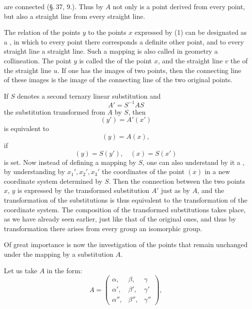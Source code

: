 are connected (\S.\,37, 9.). Thus by $A$ not only is a point derived from every point, but also a straight line from every straight line.

The relation of the points $y$ to the points $x$ expressed by (1) can be designated as a , in which to every point there corresponds a definite other point, and to every straight line a straight line. Such a mapping is also called in geometry a collineation. The point $y$ is called the  of the point $x$, and the straight line $v$ the  of the straight line $u$. If one has the images of two points, then the connecting line of these images is the image of the connecting line of the two original points.

If $S$ denotes a second ternary linear substitution and
\[ A' = S^{-1}AS \]
the substitution transformed from $A$ by $S$, then
\[ (y') = A'(x') \]
is equivalent to
\[ (y) = A(x), \]
if
\[ (y) = S(y'), \quad (x) = S(x') \]
is set. Now instead of defining a mapping by $S$, one can also understand by it a , by understanding by $x_1', x_2', x_3'$ the coordinates of the point $(x)$ in a new coordinate system determined by $S$. Then the connection between the two points $x$, $y$ is expressed by the transformed substitution $A'$ just as by $A$, and the transformation of the substitutions is thus equivalent to the transformation of the coordinate system. The composition of the transformed substitutions takes place, as we have already seen earlier, just like that of the original ones, and thus by transformation there arises from every group an isomorphic group.

Of great importance is now the investigation of the points that remain unchanged under the mapping by a substitution $A$.

Let us take $A$ in the form:
\[ A = \begin{pmatrix} \alpha, & \beta, & \gamma \\ \alpha', & \beta', & \gamma' \\ \alpha'', & \beta'', & \gamma'' \end{pmatrix}, \]
